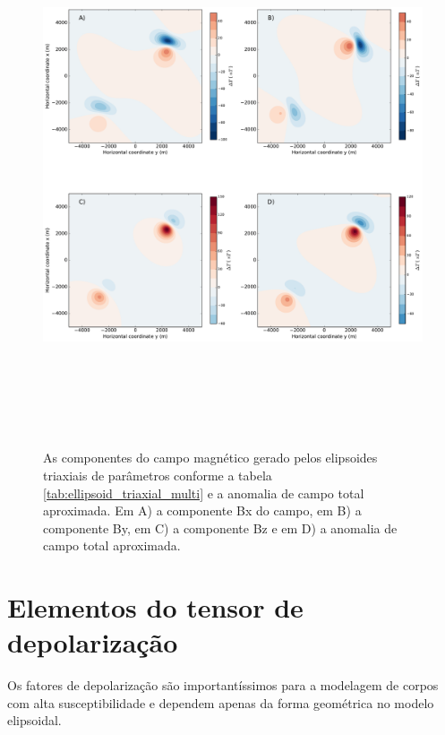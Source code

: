 \begin{figure}[hbt!]
	\centering \includegraphics[width=16cm,height=16cm]{figures/ellipsoid_triaxial_multi}
	\caption[As componentes do campo magnético gerado por um múltiplos corpos triaxiais e a anomalia de campo total aproximada.]{As componentes 
		do campo magnético gerado pelos elipsoides triaxiais de parâmetros conforme a tabela \ref{tab:ellipsoid_triaxial_multi} e a anomalia de campo total aproximada. Em A) a componente Bx do campo, em B) a componente By, em C) a componente Bz e em D) a anomalia de campo total aproximada.}
	\label{fig:ellipsoid_triaxial_multi}
\end{figure}

\section{Elementos do tensor de depolarização}

Os fatores de depolarização são importantíssimos para a modelagem de corpos com alta susceptibilidade e dependem apenas da forma geométrica no modelo elipsoidal. 

